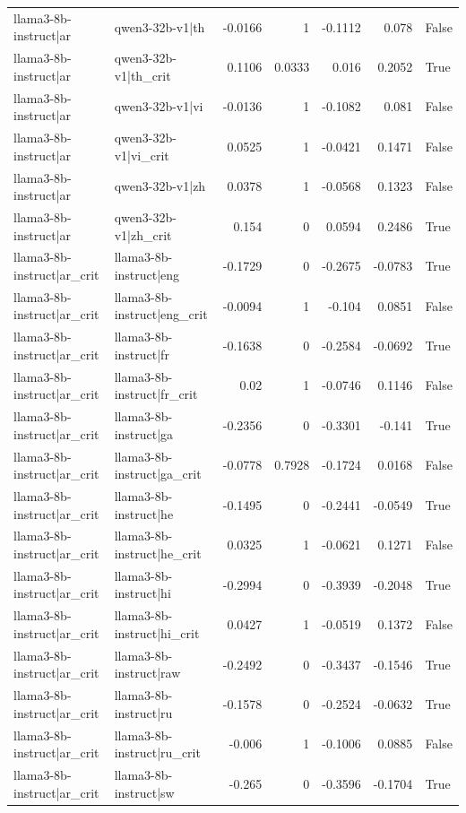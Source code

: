 \begin{table}
\begin{tabular}{l l r r r r l}
llama3-8b-instruct|ar & qwen3-32b-v1|th & -0.0166 & 1 & -0.1112 & 0.078 & False \\
llama3-8b-instruct|ar & qwen3-32b-v1|th_crit & 0.1106 & 0.0333 & 0.016 & 0.2052 & True \\
llama3-8b-instruct|ar & qwen3-32b-v1|vi & -0.0136 & 1 & -0.1082 & 0.081 & False \\
llama3-8b-instruct|ar & qwen3-32b-v1|vi_crit & 0.0525 & 1 & -0.0421 & 0.1471 & False \\
llama3-8b-instruct|ar & qwen3-32b-v1|zh & 0.0378 & 1 & -0.0568 & 0.1323 & False \\
llama3-8b-instruct|ar & qwen3-32b-v1|zh_crit & 0.154 & 0 & 0.0594 & 0.2486 & True \\
llama3-8b-instruct|ar_crit & llama3-8b-instruct|eng & -0.1729 & 0 & -0.2675 & -0.0783 & True \\
llama3-8b-instruct|ar_crit & llama3-8b-instruct|eng_crit & -0.0094 & 1 & -0.104 & 0.0851 & False \\
llama3-8b-instruct|ar_crit & llama3-8b-instruct|fr & -0.1638 & 0 & -0.2584 & -0.0692 & True \\
llama3-8b-instruct|ar_crit & llama3-8b-instruct|fr_crit & 0.02 & 1 & -0.0746 & 0.1146 & False \\
llama3-8b-instruct|ar_crit & llama3-8b-instruct|ga & -0.2356 & 0 & -0.3301 & -0.141 & True \\
llama3-8b-instruct|ar_crit & llama3-8b-instruct|ga_crit & -0.0778 & 0.7928 & -0.1724 & 0.0168 & False \\
llama3-8b-instruct|ar_crit & llama3-8b-instruct|he & -0.1495 & 0 & -0.2441 & -0.0549 & True \\
llama3-8b-instruct|ar_crit & llama3-8b-instruct|he_crit & 0.0325 & 1 & -0.0621 & 0.1271 & False \\
llama3-8b-instruct|ar_crit & llama3-8b-instruct|hi & -0.2994 & 0 & -0.3939 & -0.2048 & True \\
llama3-8b-instruct|ar_crit & llama3-8b-instruct|hi_crit & 0.0427 & 1 & -0.0519 & 0.1372 & False \\
llama3-8b-instruct|ar_crit & llama3-8b-instruct|raw & -0.2492 & 0 & -0.3437 & -0.1546 & True \\
llama3-8b-instruct|ar_crit & llama3-8b-instruct|ru & -0.1578 & 0 & -0.2524 & -0.0632 & True \\
llama3-8b-instruct|ar_crit & llama3-8b-instruct|ru_crit & -0.006 & 1 & -0.1006 & 0.0885 & False \\
llama3-8b-instruct|ar_crit & llama3-8b-instruct|sw & -0.265 & 0 & -0.3596 & -0.1704 & True \\

\end{tabular}
\end{table}
